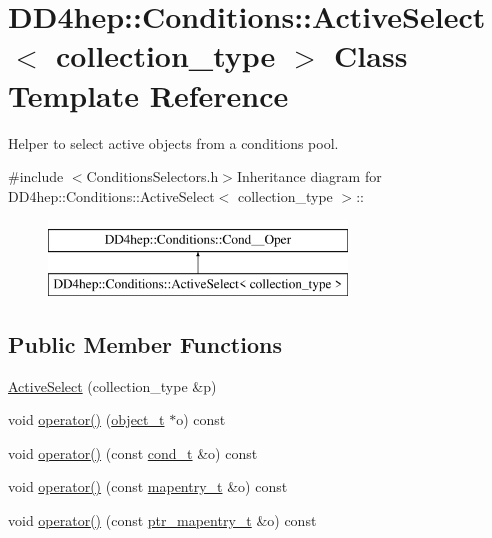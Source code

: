 \hypertarget{class_d_d4hep_1_1_conditions_1_1_active_select}{
\section{DD4hep::Conditions::ActiveSelect$<$ collection\_\-type $>$ Class Template Reference}
\label{class_d_d4hep_1_1_conditions_1_1_active_select}
}


Helper to select active objects from a conditions pool.  


{\ttfamily \#include $<$ConditionsSelectors.h$>$}Inheritance diagram for DD4hep::Conditions::ActiveSelect$<$ collection\_\-type $>$::\begin{figure}[H]
\begin{center}
\leavevmode
\includegraphics[height=2cm]{class_d_d4hep_1_1_conditions_1_1_active_select}
\end{center}
\end{figure}
\subsection*{Public Member Functions}
\begin{DoxyCompactItemize}
\item 
\hyperlink{class_d_d4hep_1_1_conditions_1_1_active_select_a2d9d54374f340a323ce197c662669427}{ActiveSelect} (collection\_\-type \&p)
\item 
void \hyperlink{class_d_d4hep_1_1_conditions_1_1_active_select_ae3a46620dcdeca50694da7eb82163e05}{operator()} (\hyperlink{class_d_d4hep_1_1_conditions_1_1_interna_1_1_condition_object}{object\_\-t} $\ast$o) const 
\item 
void \hyperlink{class_d_d4hep_1_1_conditions_1_1_active_select_ab98ffa2804b36dc77d78f7c3a46e6917}{operator()} (const \hyperlink{class_d_d4hep_1_1_conditions_1_1_condition}{cond\_\-t} \&o) const 
\item 
void \hyperlink{class_d_d4hep_1_1_conditions_1_1_active_select_ac2b8f7ae0fcbf7365076f4b3ea2997ca}{operator()} (const \hyperlink{class_d_d4hep_1_1_conditions_1_1_cond_____oper_a877dac3da66795207aed15be219acbdc}{mapentry\_\-t} \&o) const 
\item 
void \hyperlink{class_d_d4hep_1_1_conditions_1_1_active_select_a1a29db4459e5a36bcfb4a28934fc62e6}{operator()} (const \hyperlink{class_d_d4hep_1_1_conditions_1_1_cond_____oper_a0949e4bd5f90cd3fae2394cf30983973}{ptr\_\-mapentry\_\-t} \&o) const 
\end{DoxyCompactItemize}
